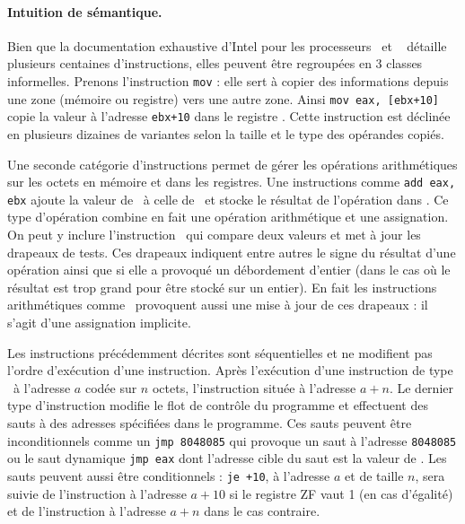 \paragraph{Intuition de sémantique.}
% 

Bien que la documentation exhaustive d'Intel pour les processeurs \xq\ et \xs\ \cite{intel_vol2} détaille plusieurs centaines d'instructions, elles peuvent être regroupées en 3 classes informelles.
Prenons l'instruction \texttt{mov} : elle sert à copier des informations depuis une zone (mémoire ou registre) vers une autre zone.
Ainsi \texttt{mov eax, [ebx+10]} copie la valeur à l'adresse \texttt{ebx+10} dans le registre \eax. 
Cette instruction est déclinée en plusieurs dizaines de variantes selon la taille et le type des opérandes copiés.

Une seconde catégorie d'instructions permet de gérer les opérations arithmétiques sur les octets en mémoire et dans les registres.
Une instructions comme \texttt{add eax, ebx} ajoute la valeur de \ebx\ à celle de \eax\ et stocke le résultat de l'opération dans \eax.
Ce type d'opération combine en fait une opération arithmétique et une assignation. 
On peut y inclure l'instruction \cmp\ qui compare deux valeurs et met à jour les drapeaux de tests. 
Ces drapeaux indiquent entre autres le signe du résultat d'une opération ainsi que si elle a provoqué un débordement d'entier (dans le cas où le résultat est trop grand pour être stocké sur un entier).
En fait les instructions arithmétiques comme \add\ provoquent aussi une mise à jour de ces drapeaux : il s'agit d'une assignation implicite.

Les instructions précédemment décrites sont séquentielles et ne modifient pas l'ordre d'exécution d'une instruction. 
Après l'exécution d'une instruction de type \mov\ à l'adresse $a$ codée sur $n$ octets, l'instruction située à l'adresse $a+n$.
Le dernier type d'instruction modifie le flot de contrôle du programme et effectuent des sauts à des adresses spécifiées dans le programme.
Ces sauts peuvent être inconditionnels comme un \texttt{jmp 8048085} qui provoque un saut à l'adresse \texttt{8048085} ou le saut dynamique \texttt{jmp eax} dont l'adresse cible du saut est la valeur de \eax.
Les sauts peuvent aussi être conditionnels : \texttt{je +10}, à l'adresse $a$ et de taille $n$, sera suivie de l'instruction à l'adresse $a+10$ si le registre ZF vaut 1 (en cas d'égalité) et de l'instruction à l'adresse $a+n$ dans le cas contraire.

